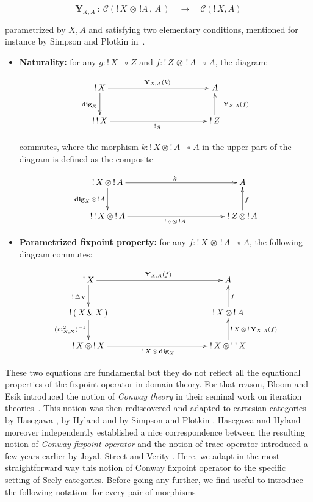 \documentclass[runningheads,a4paper]{llncs}
\newcommand{\tensor}{\otimes}
\newcommand{\laxdeux}[2]{m^2_{#1 , #2}}
\newcommand{\Ccategory}{\mathscr{C}}
\newcommand{\dig}[1]{\mathbf{dig}_{#1}}
\newcommand{\morph}[1]{\stackrel{#1}{\longrightarrow}}
\newcommand{\fixpoint}[1]{\textbf{Y}_{#1}}
\begin{document}
$$
\fixpoint{X,A}\ :\ \Ccategory(!\,X \, \tensor \, !A \, , \, A \,) \quad \morph{} \quad  \Ccategory(!\,X,A)
$$

\noindent
parametrized by $X, A$ and satisfying two elementary conditions,
mentioned for instance by Simpson and Plotkin in~\cite{simpson-plotkin}.
\begin{itemize}
\item \textbf{Naturality:} for any $g:{!\,X}\multimap Z$ and $f: {!\,Z} \, \tensor \, ! \, A \multimap A$, the diagram:

$$
\xymatrix@R=1em{
!\,X \ar[dd]_{\dig{X}} \ar[rrrr]^{\fixpoint{X,A}(k)} & & & & A\\
\\
!\,!\,X \ar[rrrr]_{!\,g} & & & & !\,Z \ar[uu]_{\ \ \fixpoint{Z,A}(f)}}
$$

\noindent
commutes, where the morphism $k:{!\,X} \tensor {!\,A} \multimap A$ in the upper part of the diagram is defined as the composite

$$
\xymatrix@R=1em{
!\,X \, \otimes \, ! \, A \ar[rrrr]^{k} \ar[dd]_{\dig{X} \,\tensor \, !A} & & & & A\\
\\
! \, ! \, X \, \otimes \, ! \, A \ar[rrrr]_{!\,g\,\tensor \, ! A} & & & & !\, Z\, \tensor \, ! \,A \ar[uu]_{f}\\
}
$$

\item \textbf{Parametrized fixpoint property:} for any $f: {!\,X} \,\tensor \, {!\,A} \multimap A$, the following diagram commutes:

$$
\xymatrix  {
!\,X \ar[d]_{!\,\diag{X}} \ar[rrrr]^{\fixpoint{X,A}(f)} & & & & A\\
!\,(\,X\,\&\,X\,) \ar[d]_{(\laxdeux{X}{X})^{-1}} & & &  & !\,X \, \tensor \, ! \, A \ar[u]_{f}\\
!\,X \, \otimes \, !\,X \ar[rrrr]_{!\,X\, \otimes\, \dig{X}} & & & &  !\,X \, \tensor \,!\,!\,X \ar[u]_{!\,X \, \tensor \, ! \, \fixpoint{X,A}(f)}\\ 
}
$$

\end{itemize}

These two equations are fundamental but they do not reflect all the equational properties 
of the fixpoint operator in domain theory.
For that reason, Bloom and Esik introduced the notion of \emph{Conway theory}
in their seminal work on iteration theories~\cite{bloom-esik,Bloom19961}.
This notion was then rediscovered and adapted to cartesian categories
by Hasegawa \cite{hasegawa},  by Hyland and by Simpson and Plotkin \cite{simpson-plotkin}.
Hasegawa and Hyland moreover independently established a nice correspondence
between the resulting notion of \emph{Conway fixpoint operator} and 
the notion of trace operator introduced a few years earlier
by Joyal, Street and Verity \cite{joyal-street-verity}.
Here, we adapt in the most straightforward way this notion of Conway fixpoint operator
to the specific setting of Seely categories.
Before going any further, we find useful to introduce the following notation: for every pair of morphisms
\end{document}
